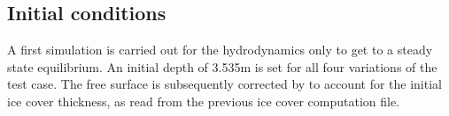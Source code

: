 \subsection{Initial conditions}
A first simulation is carried out for the hydrodynamics only to get to a steady state equilibrium.
An initial depth of 3.535m is set for all four variations of the test case. The free surface is subsequently corrected by \khione to account for the initial ice cover thickness, as read from the previous ice cover computation file.

%
%
%
%
%
